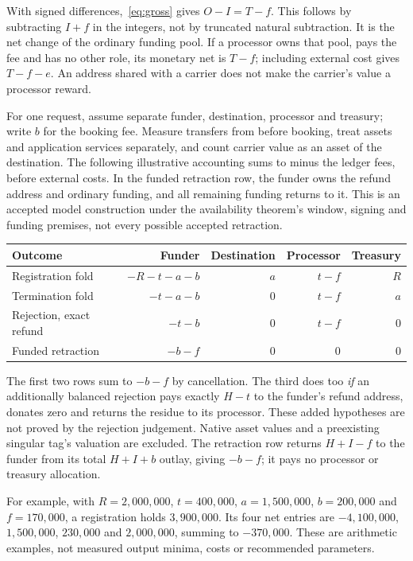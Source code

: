 \hand With signed differences,~\eqref{eq:gross} gives $O-I=T-f$.
This follows by subtracting $I+f$ in the integers, not by truncated natural
subtraction. It is the net change of the ordinary funding pool. If a processor
owns that pool, pays the fee and has no other role, its monetary net is $T-f$;
including external cost gives $T-f-e$. An address shared with a carrier does
not make the carrier's value a processor reward.

For one request, assume separate funder, destination, processor and treasury;
write $b$ for the booking fee. Measure transfers from before booking, treat
assets and application services separately, and count carrier value as an
asset of the destination. The following illustrative accounting sums to
minus the ledger fees, before external costs. In the funded retraction row,
the funder owns the refund address and ordinary funding, and all remaining
funding returns to it. This is an accepted model construction under the
availability theorem's window, signing and funding premises, not every
possible accepted retraction.
\begin{center}\small
\begin{tabular}{lrrrr}\toprule
Outcome & Funder & Destination & Processor & Treasury\\\midrule
Registration fold & $-R-t-a-b$ & $a$ & $t-f$ & $R$\\
Termination fold & $-t-a-b$ & $0$ & $t-f$ & $a$\\
Rejection, exact refund\! & $-t-b$ & $0$ & $t-f$ & $0$\\
Funded retraction & $-b-f$ & $0$ & $0$ & $0$\\\bottomrule
\end{tabular}
\end{center}
\hand The first two rows sum to $-b-f$ by cancellation. The third does too
\emph{if} an additionally balanced rejection pays exactly $H-t$ to the
funder's refund address, donates zero and returns the residue to its processor.
These added hypotheses are not proved by the rejection judgement. Native
asset values and a preexisting singular tag's valuation are excluded.
The retraction row returns $H+I-f$ to the funder from its total $H+I+b$
outlay, giving $-b-f$; it pays no processor or treasury allocation.

For example, with $R=2{,}000{,}000$, $t=400{,}000$, $a=1{,}500{,}000$,
$b=200{,}000$ and $f=170{,}000$, a registration holds $3{,}900{,}000$.
Its four net entries are $-4{,}100{,}000$, $1{,}500{,}000$, $230{,}000$
and $2{,}000{,}000$, summing to $-370{,}000$. These are arithmetic examples,
not measured output minima, costs or recommended parameters.


